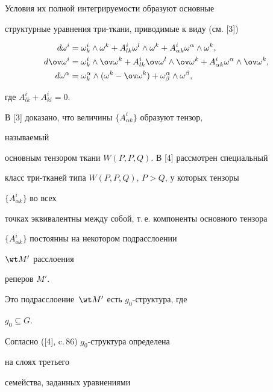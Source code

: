 Условия их полной интегрируемости образуют основные 


структурные уравнения три-ткани, приводимые к виду (см. [3])


\begin{equation} 


\begin{split} 


d\omega^i&=\omega^i_k\wedge\omega^k+A^i_{lk}\omega^l 


\wedge\omega^k+A^i_{\alpha k}\omega^\alpha\wedge\omega^k, \\ 


d\ov\omega^i&=\omega^i_k\wedge\ov\omega^k+ 


A^i_{lk}\ov\omega^l\wedge\ov\omega^k+ 


A^i_{\alpha k}\omega^\alpha\wedge\ov\omega^k, \\ 


d\omega^\alpha&=\omega^\alpha_k\wedge(\omega^k-\ov\omega^k) 


+\omega^\alpha_\beta\wedge\omega^\beta, 


\end{split} 


\end{equation} 


где $A^i_{lk}+A^i_{kl}=0$. 


 


В [3] доказано, что величины $\{A^i_{\alpha k}\}$ образуют тензор, 


называемый 


основным тензором ткани $W(P,P,Q)$. В [4] рассмотрен специальный 


класс три-тканей типа $W(P,P,Q)$, $P>Q$, у которых тензоры 


$\{A^i_{\alpha k}\}$ во всех 


точках эквивалентны между собой, т.\,е. компоненты основного тензора 


$\{A^i_{\alpha k}\}$ постоянны на некотором подрасслоении 


$\wt M'$ расслоения 


реперов $M'$. 


Это подрасслоение~$\wt M'$ есть $g_0$-структура, где 


$g_0\subseteq G$. 


Согласно ([4], c.\,86) $g_0$-структура определена 


на слоях третьего 


семейства, заданных уравнениями 


